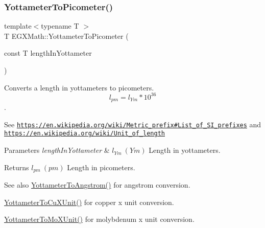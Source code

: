 \subsubsection{\texorpdfstring{Yottameter\+To\+Picometer()}{YottameterToPicometer()}}
{\footnotesize\ttfamily template$<$typename T $>$ \\
T E\+G\+X\+Math\+::\+Yottameter\+To\+Picometer (\begin{DoxyParamCaption}\item[{const T}]{length\+In\+Yottameter }\end{DoxyParamCaption})}



Converts a length in yottameters to picometers. \[ l_{pm}=l_{Ym} * 10^{36} \]. 

See \href{https://en.wikipedia.org/wiki/Metric_prefix#List_of_SI_prefixes}{\tt https\+://en.\+wikipedia.\+org/wiki/\+Metric\+\_\+prefix\#\+List\+\_\+of\+\_\+\+S\+I\+\_\+prefixes} and \href{https://en.wikipedia.org/wiki/Unit_of_length}{\tt https\+://en.\+wikipedia.\+org/wiki/\+Unit\+\_\+of\+\_\+length} 
\begin{DoxyParams}{Parameters}
{\em length\+In\+Yottameter} & $ l_{Ym}\ (Ym)$ Length in yottameters. \\
\hline
\end{DoxyParams}
\begin{DoxyReturn}{Returns}
$ l_{pm}\ (pm)$ Length in picometers. 
\end{DoxyReturn}
\begin{DoxySeeAlso}{See also}
\mbox{\hyperlink{group___e_g_x_math-_conversions-_length_conversions-_yottameter-_non-_s_i_ga0129b788ceb2d7d4ce86c155ee9d4675}{Yottameter\+To\+Angstrom()}} for angstrom conversion. 

\mbox{\hyperlink{group___e_g_x_math-_conversions-_length_conversions-_yottameter-_non-_s_i_ga5c8a9868ad238225dbf8ebdbfad13930}{Yottameter\+To\+Cu\+X\+Unit()}} for copper x unit conversion. 

\mbox{\hyperlink{group___e_g_x_math-_conversions-_length_conversions-_yottameter-_non-_s_i_ga545da9526f7a62f5ca7d1800faf17d1d}{Yottameter\+To\+Mo\+X\+Unit()}} for molybdenum x unit conversion. 
\end{DoxySeeAlso}
\mbox{\label{group___e_g_x_math-_conversions-_length_conversions-_yottameter-_s_i_ga24c70c7a3a5081e794d7cf4a37264b6c}} 
